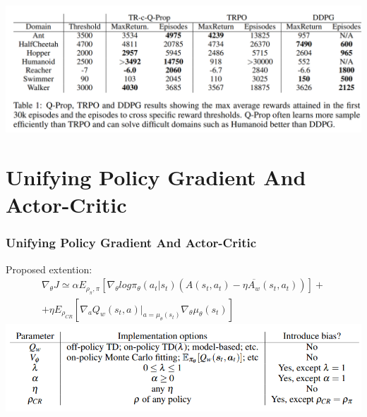 \documentclass{beamer}
\begin{document}
\begin{frame}
\includegraphics[scale=0.21]{q-prop3}
\end{frame}

\section{Unifying Policy Gradient And Actor-Critic}

\begin{frame}[t]
\frametitle{Unifying Policy Gradient And Actor-Critic}

Proposed extention:
\begin{multline*}
\nabla_{\theta} J \simeq \alpha E_{\rho_\pi, \pi} \left[ \nabla_{\theta} log \pi_\theta ( a_t | s_t) (A(s_t, a_t) - \eta \overline{A_w} (s_t,a_t)) \right] + \\ + \eta E_{\rho_{CR}} \left[ \nabla_a Q_w(s_t, a) |_{a=\mu_\theta(s_t)} 
\nabla_\theta \mu_\theta(s_t)
\right]
\end{multline*}
\includegraphics[scale=0.37]{extention}

\end{frame}
\end{document}

